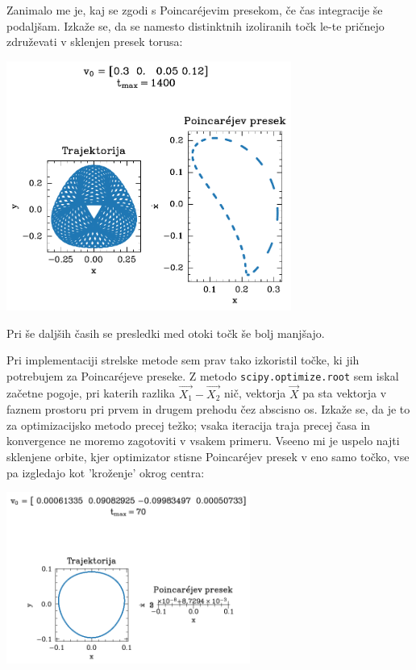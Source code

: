 Zanimalo me je, kaj se zgodi s Poincar\'{e}jevim presekom, če čas integracije še podaljšam. Izkaže se, da se namesto distinktnih izoliranih točk le-te pričnejo združevati v sklenjen presek torusa:

\begin{center}
    \includegraphics[width=0.7\textwidth]{../images/2-0-testna-orbita_dolga.pdf}
\end{center}

Pri še daljših časih se presledki med otoki točk še bolj manjšajo.

Pri implementaciji strelske metode sem prav tako izkoristil točke, ki jih potrebujem za Poincar\'{e}jeve preseke. Z metodo \texttt{scipy.optimize.root} sem iskal začetne pogoje, pri katerih razlika $\vec{X_1} - \vec{X_2}$ nič, vektorja $\vec{X}$ pa sta vektorja v faznem prostoru pri prvem in drugem prehodu čez abscisno os. Izkaže se, da je to za optimizacijsko metodo precej težko; vsaka iteracija traja precej časa in konvergence ne moremo zagotoviti v vsakem primeru. Vseeno mi je uspelo najti sklenjene orbite, kjer optimizator stisne Poincar\'{e}jev presek v eno samo točko, vse pa izgledajo kot 'kroženje' okrog centra:
\begin{center}
\includegraphics[width=0.6\textwidth]{../images/2024-2-prva-periodicna.png}
\end{center}

